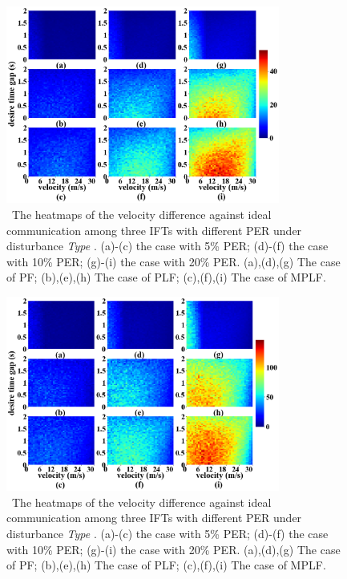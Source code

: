 \documentclass[journal]{IEEEtran}
\begin{document}
\begin{figure}
  \includegraphics[width=9cm]{fig_5.3.1.png}
  \caption{~The heatmaps of the velocity difference against ideal communication among three IFTs with different PER under disturbance \textit{Type \uppercase\expandafter{}}. (a)-(c) the case with 5\% PER; (d)-(f) the case with 10\% PER; (g)-(i) the case with 20\% PER. (a),(d),(g) The case of PF; (b),(e),(h) The case of PLF; (c),(f),(i) The case of MPLF.} 
  \label{fig_5.3.1}
  \end{figure}
\begin{figure}
  \includegraphics[width=9cm]{fig_5.3.2.png}
  \caption{~The heatmaps of the velocity difference against ideal communication among three IFTs with different PER under disturbance \textit{Type \uppercase\expandafter{}}. (a)-(c) the case with 5\% PER; (d)-(f) the case with 10\% PER; (g)-(i) the case with 20\% PER. (a),(d),(g) The case of PF; (b),(e),(h) The case of PLF; (c),(f),(i) The case of MPLF.} 
  \label{fig_5.3.2}
  \end{figure}
\end{document}
